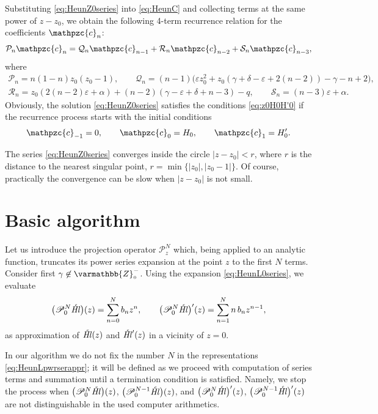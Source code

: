 \documentclass[11pt]{article}
\newcommand{\MF}[1]{\mathop{#1}\nolimits}
\newcommand{\Zzo}{\varmathbb{Z}_{\scriptscriptstyle0}^{-}}%
\newcommand{\Pcoef}{\mathcal{P}}
\newcommand{\Qcoef}{\mathcal{Q}}
\newcommand{\Rcoef}{\mathcal{R}}
\newcommand{\Scoef}{\mathcal{S}}
\def\car{\mathpzc{c}}
\def\HeunCl{\setbox0=\hbox{\tiny\itshape\bfseries \kern1.52mm c}\wd0=0pt\ht0=0pt\dp0=0pt\MF{\textit{\hbox{\raise1.67ex\copy0}Hl\/}}}%
\begin{document}
Substituting \eqref{eq:HeunZ0series} into \eqref{eq:HeunC} and collecting terms
at the same power of $z-z_0$, we obtain the following 4-term recurrence
relation for the coefficients $\car_n$:
\begin{equation}
\Pcoef_n \car_n=\Qcoef_n \car_{n-1}+\Rcoef_n \car_{n-2} + \Scoef_n
\car_{n-3},\label{eq:HeunZ0Cndef}
\end{equation}
where
\begin{gather*}
\Pcoef_n=n(1-n)z_0(z_0-1),\qquad
\Qcoef_n=(n-1)
\bigl(\varepsilon z_0^2+z_0(\gamma+\delta-\varepsilon+2(n-2))-\gamma-n+2\bigr), \\
\Rcoef_n=z_0(2(n-2)\varepsilon+\alpha)+(n-2)(\gamma-\varepsilon+\delta+n-3)-q,\qquad
\Scoef_n=(n-3)\varepsilon+\alpha.
\end{gather*}
Obviously, the solution \eqref{eq:HeunZ0series} satisfies the conditions \eqref{eq:z0H0H'0} if
the recurrence process starts with the initial conditions 
\begin{equation*}
\car_{-1}=0,\qquad \car_{0}=H_0,\qquad \car_{1}=H'_0.
\end{equation*}

The series \eqref{eq:HeunZ0series} converges inside the circle $|z-z_0|<r$,
where $r$ is the distance to the nearest singular point,
$r=\min\{|z_0|,|z_0-1|\}$. Of course, practically the convergence can be slow when $|z-z_0|$ is not small.

\section{Basic algorithm}
\label{sect:basic_algorithm}

Let us introduce the projection operator $\mathscr{P}_{z}^N$ which, being applied to
an analytic function, truncates its power series expansion at the point $z$ to
the first $N$ terms. Consider first $\gamma\not\in\Zzo$. Using the expansion \eqref{eq:HeunL0series}, we evaluate
\begin{equation}
\bigl(\mathscr{P}_0^N\!\HeunCl\bigr)(z)=\sum_{n=0}^{N}b_n z^n,\qquad
\bigl(\mathscr{P}_0^N\!\HeunCl\bigr)'(z)=\sum_{n=1}^{N}n\, b_n z^{n-1},
\label{eq:HeunLpwrserappr}
\end{equation}
as  approximation of $\HeunCl(z)$ and $\HeunCl'(z)$  in a vicinity of $z=0$.

In our algorithm we do not fix the number $N$ in the representations
\eqref{eq:HeunLpwrserappr}; it will be defined as we proceed with
computation of series terms and summation until a termination
condition is satisfied. Namely, we stop the process when
$\bigl(\mathscr{P}_0^{N}\!\HeunCl\bigr)(z)$,
$\bigl(\mathscr{P}_0^{N-1}\!\HeunCl\bigr)(z)$, and
$\bigl(\mathscr{P}_0^{N}\!\HeunCl\bigr)'(z)$,
$\bigl(\mathscr{P}_0^{N-1}\!\HeunCl\bigr)'(z)$ are not distinguishable in the
used computer arithmetics.
\end{document}
